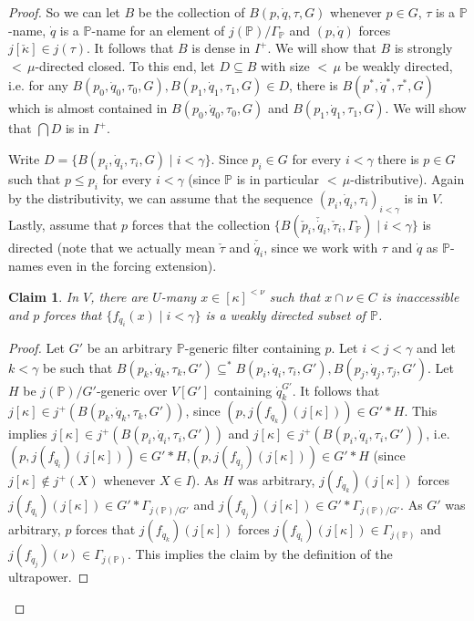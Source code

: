 \documentclass[a4paper]{amsart}
\theoremstyle{definition}
\theoremstyle{remark}
\theoremstyle{plain}
\newtheorem{myclaim}{Claim}
\numberwithin{mydef}{section}
\newcommand{\dP}{\mathbb{P}}
\begin{document}
\begin{proof}
		So we can let $B$ be the collection of $B(p,\dot{q},\tau,G)$ whenever $p\in G$, $\tau$ is a $\dP$-name, $\dot{q}$ is a $\dP$-name for an element of $j(\dP)/\Gamma_{\dP}$ and $(p,\dot{q})$ forces $j[\check{\kappa}]\in j(\tau)$. It follows that $B$ is dense in $I^+$. We will show that $B$ is strongly ${<}\,\mu$-directed closed. To this end, let $D\subseteq B$ with size ${<}\,\mu$ be weakly directed, i.e. for any $B(p_0,\dot{q}_0,\tau_0,G),B(p_1,\dot{q}_1,\tau_1,G)\in D$, there is $B(p^*,\dot{q}^*,\tau^*,G)$ which is almost contained in $B(p_0,\dot{q}_0,\tau_0,G)$ and $B(p_1,\dot{q}_1,\tau_1,G)$. We will show that $\bigcap D$ is in $I^+$.
		
		Write $D=\{B(p_i,\dot{q}_i,\tau_i,G)\;|\;i<\gamma\}$. Since $p_i\in G$ for every $i<\gamma$ there is $p\in G$ such that $p\leq p_i$ for every $i<\gamma$ (since $\dP$ is in particular ${<}\,\mu$-distributive). Again by the distributivity, we can assume that the sequence $(p_i,\dot{q}_i,\tau_i)_{i<\gamma}$ is in $V$. Lastly, assume that $p$ forces that the collection $\{B(\check{p}_i,\check{\dot{q}}_i,\check{\tau}_i,\Gamma_{\dP})\;|\;i<\gamma\}$ is directed (note that we actually mean $\check{\tau}$ and $\check{\dot{q}_i}$, since we work with $\tau$ and $\dot{q}$ as $\dP$-names even in the forcing extension).
		
		\begin{myclaim}\label{LIPLemmaClaim3}
			In $V$, there are $U$-many $x\in[\kappa]^{<\nu}$ such that $x\cap\nu\in C$ is inaccessible and $p$ forces that $\{f_{\dot{q}_i}(x)\;|\;i<\gamma\}$ is a weakly directed subset of $\dP$.
		\end{myclaim}
		
		\begin{proof}
			Let $G'$ be an arbitrary $\dP$-generic filter containing $p$. Let $i<j<\gamma$ and let $k<\gamma$ be such that $B(p_k,\dot{q}_k,\tau_k,G')\subseteq^* B(p_i,\dot{q}_i,\tau_i,G'),B(p_j,\dot{q}_j,\tau_j,G')$. Let $H$ be $j(\dP)/G'$-generic over $V[G']$ containing $\dot{q}_k^{G'}$. It follows that $j[\kappa]\in j^+(B(p_k,\dot{q}_k,\tau_k,G'))$, since $(p,j(f_{\dot{q}_k})(j[\kappa]))\in G'*H$. This implies $j[\kappa]\in j^+(B(p_i,\dot{q}_i,\tau_i,G'))$ and $j[\kappa]\in j^+(B(p_i,\dot{q}_i,\tau_i,G'))$, i.e. $(p,j(f_{\dot{q}_i})(j[\kappa]))\in G'*H$,$(p,j(f_{\dot{q}_j})(j[\kappa]))\in G'*H$ (since $j[\kappa]\notin j^+(X)$ whenever $X\in I$). As $H$ was arbitrary, $j(f_{\dot{q}_k})(j[\kappa])$ forces $j(f_{\dot{q}_i})(j[\kappa])\in G'*\Gamma_{j(\dP)/G'}$ and $j(f_{\dot{q}_j})(j[\kappa])\in G'*\Gamma_{j(\dP)/G'}$. As $G'$ was arbitrary, $p$ forces that $j(f_{\dot{q}_k})(j[\kappa])$ forces $j(f_{\dot{q}_i})(j[\kappa])\in\Gamma_{j(\dP)}$ and $j(f_{\dot{q}_j})(\nu)\in\Gamma_{j(\dP)}$. This implies the claim by the definition of the ultrapower.
		\end{proof}
		

\end{proof}
\end{document}
